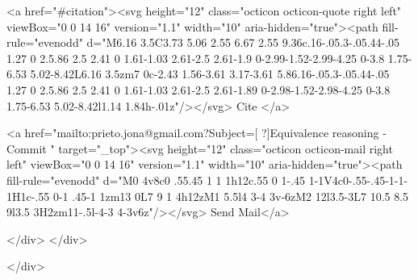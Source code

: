       <a  href="#citation"><svg height="12" class="octicon octicon-quote right left" viewBox="0 0 14 16" version="1.1" width="10" aria-hidden="true"><path fill-rule="evenodd" d="M6.16 3.5C3.73 5.06 2.55 6.67 2.55 9.36c.16-.05.3-.05.44-.05 1.27 0 2.5.86 2.5 2.41 0 1.61-1.03 2.61-2.5 2.61-1.9 0-2.99-1.52-2.99-4.25 0-3.8 1.75-6.53 5.02-8.42L6.16 3.5zm7 0c-2.43 1.56-3.61 3.17-3.61 5.86.16-.05.3-.05.44-.05 1.27 0 2.5.86 2.5 2.41 0 1.61-1.03 2.61-2.5 2.61-1.89 0-2.98-1.52-2.98-4.25 0-3.8 1.75-6.53 5.02-8.42l1.14 1.84h-.01z"/></svg> Cite
      </a>

      <a href="mailto:prieto.jona@gmail.com?Subject=[ ?]Equivalence reasoning - Commit " target="_top"><svg height="12" class="octicon octicon-mail right left" viewBox="0 0 14 16" version="1.1" width="10" aria-hidden="true"><path fill-rule="evenodd" d="M0 4v8c0 .55.45 1 1 1h12c.55 0 1-.45 1-1V4c0-.55-.45-1-1-1H1c-.55 0-1 .45-1 1zm13 0L7 9 1 4h12zM1 5.5l4 3-4 3v-6zM2 12l3.5-3L7 10.5 8.5 9l3.5 3H2zm11-.5l-4-3 4-3v6z"/></svg> Send Mail</a>

    </div>
  </div>

</div>




